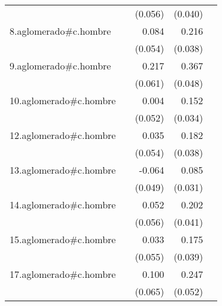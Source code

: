 {\begin{longtable}{l*{4}{D{.}{.}{-1}}}
            &                     &     (0.056)         &     (0.040)         &                     \\
\addlinespace
8.aglomerado#c.hombre&                     &       0.084         &       0.216\sym{***}&                     \\
            &                     &     (0.054)         &     (0.038)         &                     \\
\addlinespace
9.aglomerado#c.hombre&                     &       0.217\sym{***}&       0.367\sym{***}&                     \\
            &                     &     (0.061)         &     (0.048)         &                     \\
\addlinespace
10.aglomerado#c.hombre&                     &       0.004         &       0.152\sym{***}&                     \\
            &                     &     (0.052)         &     (0.034)         &                     \\
\addlinespace
12.aglomerado#c.hombre&                     &       0.035         &       0.182\sym{***}&                     \\
            &                     &     (0.054)         &     (0.038)         &                     \\
\addlinespace
13.aglomerado#c.hombre&                     &      -0.064         &       0.085\sym{**} &                     \\
            &                     &     (0.049)         &     (0.031)         &                     \\
\addlinespace
14.aglomerado#c.hombre&                     &       0.052         &       0.202\sym{***}&                     \\
            &                     &     (0.056)         &     (0.041)         &                     \\
\addlinespace
15.aglomerado#c.hombre&                     &       0.033         &       0.175\sym{***}&                     \\
            &                     &     (0.055)         &     (0.039)         &                     \\
\addlinespace
17.aglomerado#c.hombre&                     &       0.100         &       0.247\sym{***}&                     \\
            &                     &     (0.065)         &     (0.052)         &                     \\

\end{longtable}}

